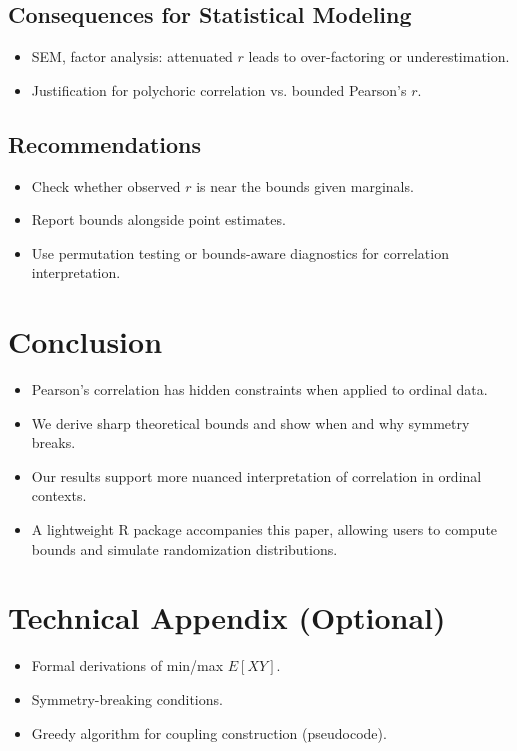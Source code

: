 \documentclass[12pt]{article}
\begin{document}
\subsection{Consequences for Statistical Modeling}
\begin{itemize}
  \item SEM, factor analysis: attenuated \( r \) leads to over-factoring or underestimation.
  \item Justification for polychoric correlation vs. bounded Pearson’s \( r \).
\end{itemize}

\subsection{Recommendations}
\begin{itemize}
  \item Check whether observed \( r \) is near the bounds given marginals.
  \item Report bounds alongside point estimates.
  \item Use permutation testing or bounds-aware diagnostics for correlation interpretation.
\end{itemize}

\section{Conclusion}
\begin{itemize}
  \item Pearson’s correlation has hidden constraints when applied to ordinal data.
  \item We derive sharp theoretical bounds and show when and why symmetry breaks.
  \item Our results support more nuanced interpretation of correlation in ordinal contexts.
  \item A lightweight R package accompanies this paper, allowing users to compute bounds and simulate randomization distributions.
\end{itemize}

\appendix
\section*{Technical Appendix (Optional)}
\begin{itemize}
  \item Formal derivations of min/max \( E[XY] \).
  \item Symmetry-breaking conditions.
  \item Greedy algorithm for coupling construction (pseudocode).
\end{itemize}

\printbibliography
\end{document}

